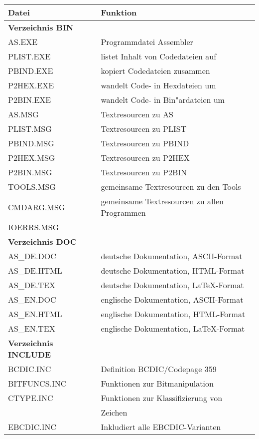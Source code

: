 \documentclass[12pt,a4paper,twoside]{report}
\begin{document}
\begin{center}\begin{longtable}{|l|l|}
\hline
Datei             & Funktion \\
\hline
\hline
\endhead
{\bf Verzeichnis BIN} & \\
\hline
AS.EXE            & Programmdatei Assembler \\
PLIST.EXE         & listet Inhalt von Codedateien auf \\
PBIND.EXE         & kopiert Codedateien zusammen \\
P2HEX.EXE         & wandelt Code- in Hexdateien um \\
P2BIN.EXE         & wandelt Code- in Bin"ardateien um \\
AS.MSG            & Textresourcen zu AS \\
PLIST.MSG         & Textresourcen zu PLIST \\
PBIND.MSG         & Textresourcen zu PBIND \\
P2HEX.MSG         & Textresourcen zu P2HEX \\
P2BIN.MSG         & Textresourcen zu P2BIN \\
TOOLS.MSG         & gemeinsame Textresourcen zu den Tools \\
CMDARG.MSG        & gemeinsame Textresourcen zu allen Programmen \\
IOERRS.MSG        & \\
\hline
{\bf Verzeichnis DOC} & \\
\hline
AS\_DE.DOC        & deutsche Dokumentation, ASCII-Format \\
AS\_DE.HTML       & deutsche Dokumentation, HTML-Format \\
AS\_DE.TEX        & deutsche Dokumentation, LaTeX-Format \\
AS\_EN.DOC        & englische Dokumentation, ASCII-Format \\
AS\_EN.HTML       & englische Dokumentation, HTML-Format \\
AS\_EN.TEX        & englische Dokumentation, LaTeX-Format \\
\hline
{\bf Verzeichnis INCLUDE} & \\
\hline
BCDIC.INC         & Definition BCDIC/Codepage 359 \\
BITFUNCS.INC      & Funktionen zur Bitmanipulation \\
CTYPE.INC         & Funktionen zur Klassifizierung von \\
                  & Zeichen \\
EBCDIC.INC        & Inkludiert alle EBCDIC-Varianten \\

\end{longtable}
\end{center}
\end{document}
